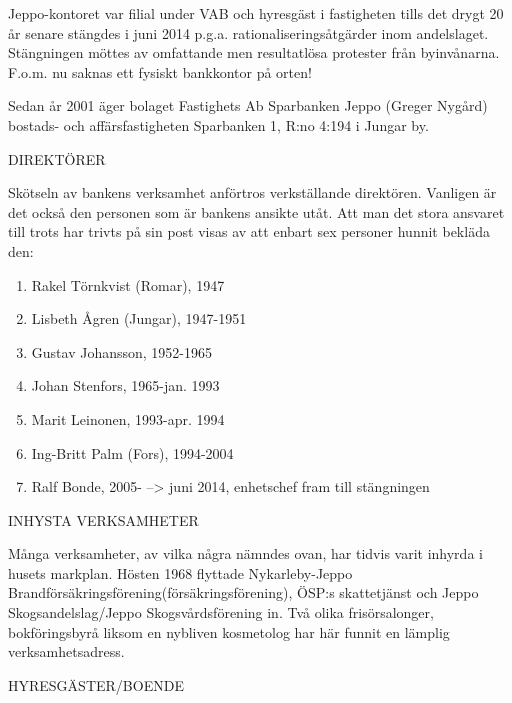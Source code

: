 Jeppo-kontoret var filial under VAB och hyresgäst i fastigheten tills det drygt 20 år senare stängdes i juni 2014 p.g.a. rationaliseringsåtgärder inom andelslaget. Stängningen möttes av omfattande men resultatlösa protester från byinvånarna. F.o.m. nu saknas ett fysiskt bankkontor på orten!

Sedan år 2001 äger bolaget Fastighets Ab Sparbanken Jeppo (Greger Nygård) bostads- och affärsfastigheten Sparbanken 1, R:no 4:194 i Jungar by.


DIREKTÖRER

Skötseln av bankens verksamhet anförtros verkställande direktören. Vanligen är det också den personen som är bankens ansikte utåt. Att man det stora ansvaret till trots har trivts på sin post visas av att enbart sex personer hunnit bekläda den:
\begin{enumerate}
  \item Rakel Törnkvist (Romar),	1947
  \item Lisbeth Ågren (Jungar),	1947-1951
  \item Gustav Johansson,		1952-1965
  \item Johan Stenfors,		1965-jan. 1993
  \item Marit Leinonen,		1993-apr. 1994
  \item Ing-Britt Palm (Fors),	1994-2004
  \item Ralf Bonde, 			2005- --> juni 2014, enhetschef fram till stängningen
\end{enumerate}

INHYSTA VERKSAMHETER

Många verksamheter, av vilka några nämndes ovan, har tidvis varit inhyrda i husets markplan. Hösten 1968 flyttade Nykarleby-Jeppo Brandförsäkringsförening(försäkringsförening), ÖSP:s skattetjänst och Jeppo Skogsandelslag/Jeppo Skogsvårdsförening in. Två olika frisörsalonger, bokföringsbyrå liksom en nybliven kosmetolog har här funnit en lämplig verksamhetsadress.


HYRESGÄSTER/BOENDE

